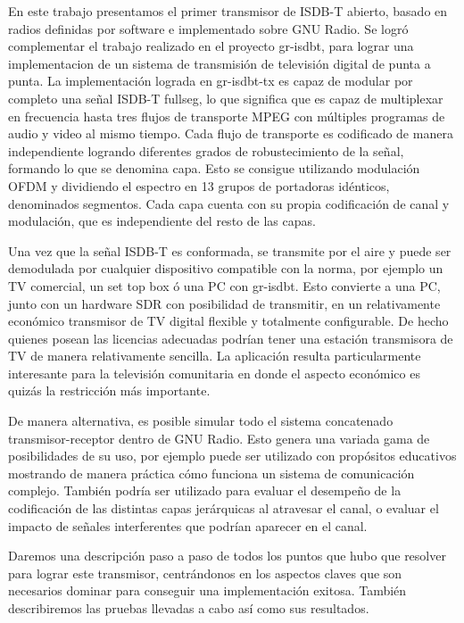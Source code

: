 En este trabajo presentamos el primer transmisor de ISDB-T abierto, basado en radios definidas por software e implementado sobre GNU Radio. Se logró complementar el trabajo realizado en el proyecto gr-isdbt, para lograr una implementacion de un sistema de transmisión de televisión digital de punta a punta. La implementación lograda en gr-isdbt-tx es capaz de modular por completo una señal ISDB-T fullseg, lo que significa que es capaz de multiplexar en frecuencia hasta tres flujos de transporte MPEG con múltiples programas de audio y video al mismo tiempo. Cada flujo de transporte es codificado de manera independiente logrando diferentes grados de robustecimiento de la señal, formando lo que se denomina capa. Esto se consigue utilizando modulación OFDM y dividiendo el espectro en 13 grupos de portadoras idénticos, denominados segmentos. Cada capa cuenta con su propia codificación de canal y modulación, que es independiente del resto de las capas.

Una vez que la señal ISDB-T es conformada, se transmite por el aire y puede ser demodulada por cualquier dispositivo compatible con la norma, por ejemplo un TV comercial, un set top box ó una PC con gr-isdbt. Esto convierte a una PC, junto con un hardware SDR con posibilidad de transmitir, en un relativamente económico transmisor de TV digital flexible y totalmente configurable. De hecho quienes posean las licencias adecuadas podrían tener una estación transmisora de TV de manera relativamente sencilla. La aplicación resulta particularmente interesante para la televisión comunitaria en donde el aspecto económico es quizás la restricción más importante.

De manera alternativa, es posible simular todo el sistema concatenado transmisor-receptor dentro de GNU Radio. Esto genera una variada gama de posibilidades de su uso, por ejemplo puede ser utilizado con propósitos educativos mostrando de manera práctica cómo funciona un sistema de comunicación complejo. También podría ser utilizado para evaluar el desempeño de la codificación de las distintas capas jerárquicas al atravesar el canal, o evaluar el impacto de señales interferentes que podrían aparecer en el canal. 

Daremos una descripción paso a paso de todos los puntos que hubo que resolver para lograr este transmisor, centrándonos en los aspectos claves que son necesarios dominar para conseguir una implementación exitosa. También describiremos las pruebas llevadas a cabo así como sus resultados. 